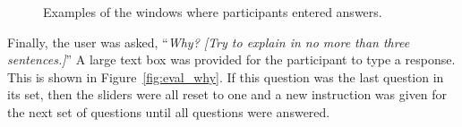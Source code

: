 


\begin{figure}
\centering


	\caption[Examples of the windows where participants entered answers]{Examples of the windows where participants entered answers.}
	\label{fig:eval}
\end{figure}




Finally, the user was asked, ``\textit{Why? [Try to explain in no more than three sentences.]}''  A large text box was provided for the participant to type a response.  This is shown in Figure~\ref{fig:eval_why}. If this question was the last question in its set, then the sliders were all reset to one and a new instruction was given for the next set of questions until all questions were answered. 


